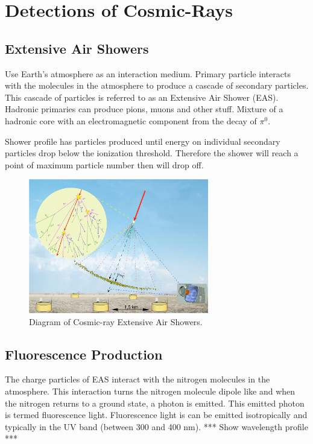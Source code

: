 \chapter{Detections of Cosmic-Rays}\label{Ch:CR_Detection}

\section{Extensive Air Showers}

Use Earth's atmosphere as an interaction medium.
Primary particle interacts with the molecules in the atmosphere to produce a cascade of secondary particles. This cascade of particles is referred to as an Extensive Air Shower (EAS).
Hadronic primaries can produce pions, muons and other stuff.
Mixture of a hadronic core with an electromagnetic component from the decay of $\pi^{0}$.

Shower profile has particles produced until energy on individual secondary particles drop below the ionization threshold. Therefore the shower will reach a point of maximum particle number then will drop off.

\begin{figure}
\centering
\includegraphics[width=0.7\textwidth]{chapters/pix/CR_ExtensiveAirShowers.png}
\caption{Diagram of Cosmic-ray Extensive Air Showers.}
\end{figure}

\section{Fluorescence Production}

The charge particles of EAS interact with the nitrogen molecules in the atmosphere. This interaction turns the nitrogen molecule dipole like and when the nitrogen returns to a ground state, a photon is emitted. This emitted photon is termed fluorescence light. Fluorescence light is can be emitted isotropically and typically in the UV band (between 300 and 400 nm). *** Show wavelength profile ***



